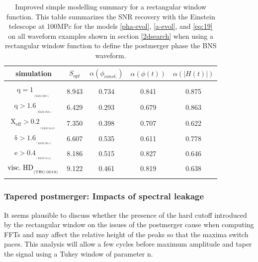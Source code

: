 \begin{table}[!htbp]
\begin{center}

\begin{tabular}{ccccc}

simulation&$S_{opt}$&$\alpha(\phi_{const.})$&$\alpha(\phi(t))$&$\alpha(|H(t)|)$\\ 
\hline\\ 
$\mathrm{{q=1}_{_{_{(BAM:0035)}}}}$&8.943&0.734&0.841&0.875\\  
$\mathrm{{q>1.6}_{_{_{(BAM:0021)}}}}$&6.429&0.293&0.679&0.863\\  
$\mathrm{{X_{eff}>0.2}_{_{_{(BAM:0110)}}}}$&7.350&0.398&0.707&0.622\\  
$\mathrm{{\delta>1.6}_{_{_{(BAM:0011)}}}}$&6.607&0.535&0.611&0.778\\  
$\mathrm{{e>0.4}_{_{_{(BAM:0114)}}}}$&8.186&0.515&0.827&0.646\\  
$\mathrm{{visc.\hspace{1mm} HD}_{_{_{(THC:0019)}}}}$&9.122&0.461&0.819&0.638\\  
\hline\\ 
\end{tabular}
\captionsetup{width=0.8\textwidth}
\caption[Improved simple modelling summary for a rectangular window function]{Improved simple modelling summary for a rectangular window function. This table summarizes the SNR recovery with the Einstein telescope at 100MPc for the models \ref{pha-evol}, \ref{a-evol}, and \ref{eq:19} on all waveform examples shown in section \ref{2dsearch} when using a rectangular window function to define the postmerger phase the BNS waveform.}
\label{table untapered}
\end{center}
\end{table}
\FloatBarrier




\subsubsection*{Tapered postmerger: Impacts of spectral leakage}

It seems plausible to discuss whether the presence of the hard cutoff introduced by the rectangular window on the issues of the postmerger cause when computing FFTs and may affect the relative height of the peaks so that the maxima switch paces. This analysis will allow a few cycles before maximum amplitude and taper the signal using a Tukey window \cite{bloomfield1976fourier} of parameter n.


